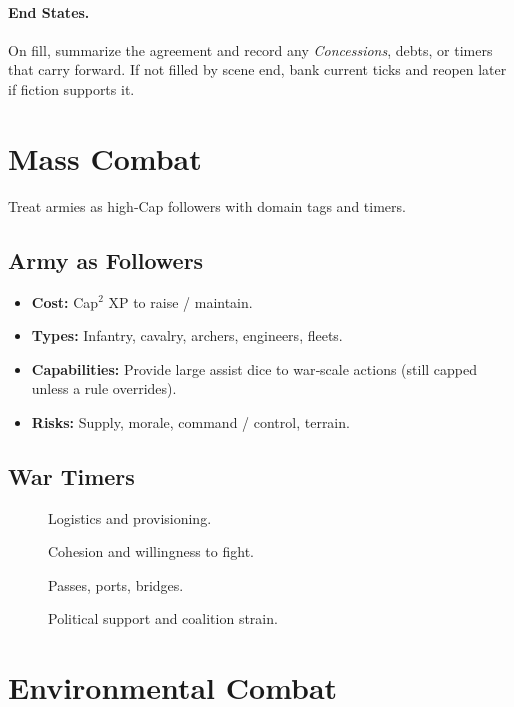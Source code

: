 \paragraph{End States.}
On fill, summarize the agreement and record any \emph{Concessions}, debts, or timers that carry forward. If not filled by scene end, bank current ticks and reopen later if fiction supports it.

\section{Mass Combat}\label{sec:mass_combat}
Treat armies as high‑Cap followers with domain tags and timers.

\subsection{Army as Followers}\label{subsec:army_followers}
\begin{itemize}
    \item \textbf{Cost:} Cap\(^{2}\) XP to raise / maintain.
    \item \textbf{Types:} Infantry, cavalry, archers, engineers, fleets.
    \item \textbf{Capabilities:} Provide large assist dice to war‑scale actions (still capped unless a rule overrides).
    \item \textbf{Risks:} Supply, morale, command / control, terrain.
\end{itemize}

\subsection{War Timers}\label{subsec:war_timers}
\begin{description}
    \item[] Logistics and provisioning.
    \item[] Cohesion and willingness to fight.
    \item[] Passes, ports, bridges.
    \item[] Political support and coalition strain.
\end{description}

\section{Environmental Combat}\label{sec:environmental_combat}

